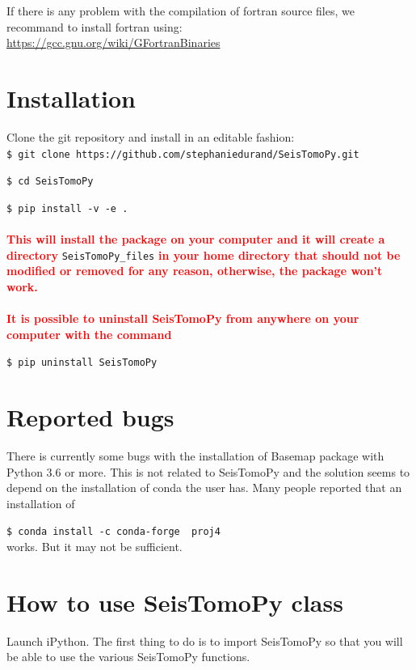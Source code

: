 \documentclass[12pt]{article}
\begin{document}
\noindent If there is any problem with the compilation of fortran source files, we recommand to install fortran using:\\
\url{https://gcc.gnu.org/wiki/GFortranBinaries}

\section{Installation}

Clone the git repository and install in an editable fashion:\\

\verb?$ git clone https://github.com/stephaniedurand/SeisTomoPy.git?

\verb?$ cd SeisTomoPy?

\verb?$ pip install -v -e .?
\\
\\
\noindent   \textcolor{red}{\textbf{This will install the package on your computer and it will create a directory}} \verb?SeisTomoPy_files? \textcolor{red}{\textbf{in your home directory that should not be modified or removed for any reason, otherwise, the package won't work.}} \\
\\
  \textcolor{red}{\textbf{It is possible to uninstall SeisTomoPy from anywhere on your computer with the command}}

\verb?$ pip uninstall SeisTomoPy?

\section{Reported bugs}

There is currently some bugs with the installation of Basemap package with Python 3.6 or more. This is not related to SeisTomoPy and the solution seems to depend on the installation of conda the user has. Many people reported that an installation of 

\verb?$ conda install -c conda-forge  proj4?\\
works. But it may not be sufficient.

  \section{How to use SeisTomoPy class}\label{how-to-use-SeisTomoPy-class }\label{important-starting-notes} 

Launch iPython. The first thing to do is to import SeisTomoPy so that you will
be able to use the various SeisTomoPy functions. 
\end{document}
